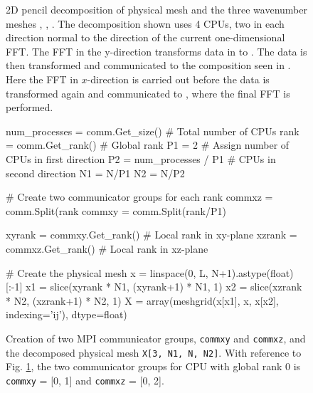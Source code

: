 \documentclass[11pt, oneside]{article}
\newcommand{\inpyth}{\lstinline[style=pythonstyle, basicstyle=\ttfamily]} %[]%
\begin{document}
\begin{figure}
{  \label{subfig2}
  }
\caption{2D pencil decomposition of physical mesh  and the three wavenumber meshes , , . The decomposition shown uses 4 CPUs, two in each direction normal to the direction of the current one-dimensional FFT. The FFT in the y-direction transforms data in  to . The data is then transformed and communicated to the composition seen in . Here the FFT in $x$-direction is carried out before the data is transformed again and communicated to , where the final FFT is performed.}
\label{fig:Pencildecomp}
\end{figure}

\begin{figure}
\begin{python}
num_processes = comm.Get_size() # Total number of CPUs
rank = comm.Get_rank()  # Global rank
P1 = 2     # Assign number of CPUs in first direction
P2 = num_processes / P1 # CPUs in second direction
N1 = N/P1
N2 = N/P2

# Create two communicator groups for each rank
commxz = comm.Split(rank%
commxy = comm.Split(rank/P1)

xyrank = commxy.Get_rank() # Local rank in xy-plane
xzrank = commxz.Get_rank() # Local rank in xz-plane

# Create the physical mesh
x = linspace(0, L, N+1).astype(float)[:-1]
x1 = slice(xyrank * N1, (xyrank+1) * N1, 1)
x2 = slice(xzrank * N2, (xzrank+1) * N2, 1)
X = array(meshgrid(x[x1], x, x[x2], indexing='ij'), dtype=float)
\end{python}
\caption{Creation of two MPI communicator groups, \inpyth{commxy} and \inpyth{commxz}, and the decomposed physical mesh \inpyth{X[3, N1, N, N2]}. With reference to Fig. \ref{fig:Pencildecomp}, the two communicator groups for CPU with global rank 0 is \inpyth{commxy} = [0, 1] and \inpyth{commxz} = [0, 2].}
\label{fig:commgroups}
\end{figure}
\end{document}
